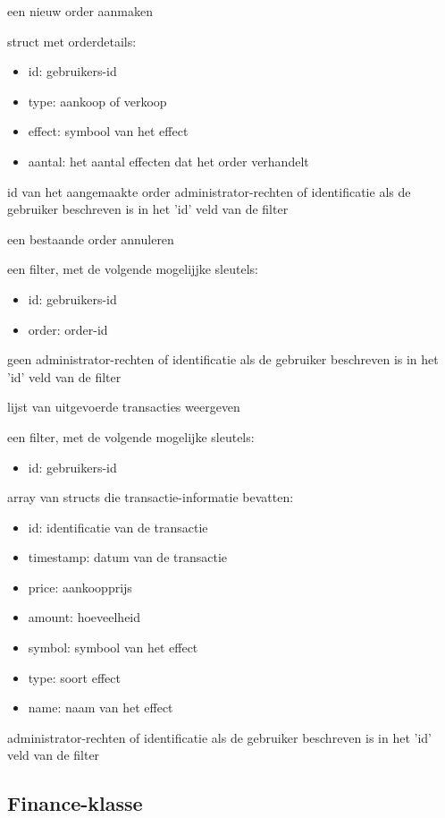 	{ een nieuw order aanmaken }
	{ struct met orderdetails:
		\begin{itemize}
		\item{id: gebruikers-id}
		\item{type: aankoop of verkoop}
		\item{effect: symbool van het effect}
		\item{aantal: het aantal effecten dat het order verhandelt}
		\end{itemize} }
	{ id van het aangemaakte order }
	{ administrator-rechten of identificatie als de gebruiker beschreven is in het 'id' veld van de filter }

	{ een bestaande order annuleren }
	{ een filter, met de volgende mogelijjke sleutels:
		\begin{itemize}
		\item{id: gebruikers-id}
		\item{order: order-id}
		\end{itemize} }
	{ geen }
	{ administrator-rechten of identificatie als de gebruiker beschreven is in het 'id' veld van de filter }

	{ lijst van uitgevoerde transacties weergeven }
	{ een filter, met de volgende mogelijke sleutels:
		\begin{itemize}
		\item{id: gebruikers-id}
		\end{itemize} }
	{ array van structs die transactie-informatie bevatten:
		\begin{itemize}
		\item{id: identificatie van de transactie}
		\item{timestamp: datum van de transactie}
		\item{price: aankoopprijs}
		\item{amount: hoeveelheid}
		\item{symbol: symbool van het effect}
		\item{type: soort effect}
		\item{name: naam van het effect}
		\end{itemize} }
	{ administrator-rechten of identificatie als de gebruiker beschreven is in het 'id' veld van de filter }

\subsection{Finance-klasse}

